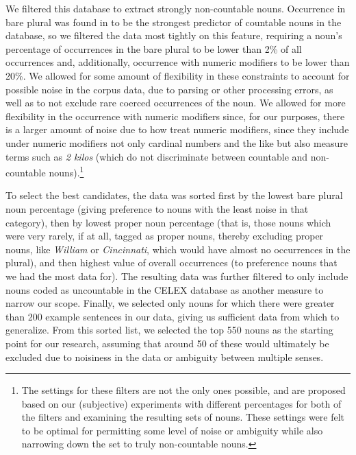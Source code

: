 \documentclass[output=paper]{langscibook}
\begin{document}
We filtered this database to extract strongly non-countable nouns. Occurrence in bare plural was found in \citet{GrimmWahlang2020} to be the strongest predictor of countable nouns in the database, so we filtered the data most tightly on this feature, requiring a noun's  percentage of occurrences in the bare plural  to be lower than 2\% of all occurrences and, additionally, occurrence with numeric modifiers to be lower  than 20\%. We allowed for some amount of flexibility in these constraints to account for possible noise in the corpus data, due to parsing or other processing errors, as well as to not exclude rare coerced occurrences of the noun.  We allowed for more flexibility in the occurrence with numeric modifiers  since, for our purposes, there is a larger amount of noise due to how  \citet{de-marneffe-etal2014} treat numeric modifiers, since they include under numeric modifiers not only cardinal numbers and the like but also measure terms such as \textit{2 kilos} (which do not discriminate between countable and non-countable nouns).\footnote{The settings for these filters are not the only ones possible, and are proposed based on our (subjective) experiments with different percentages for both of the filters and examining the resulting sets of nouns.  These settings were felt to be optimal for permitting some level of noise or ambiguity while also narrowing down the set to truly non-countable nouns.}





 

 To select the best candidates, the data was sorted first by the lowest bare plural noun percentage (giving preference to nouns with the least noise in that category), then by lowest proper noun percentage (that is, those nouns which were very rarely, if at all, tagged as proper nouns, thereby excluding proper nouns, like \textit{William} or \textit{Cincinnati}, which would have almost no occurrences in the plural), and then highest value of overall occurrences (to preference nouns that we had the most data for).  The resulting data was further filtered to only include nouns coded as uncountable in the CELEX database \citep{CELEX} as another measure to narrow our scope. Finally, we selected only nouns for which there were greater than 200 example sentences in our data, giving us sufficient data from which to generalize. From this sorted list, we selected the top 550 nouns as the starting point for our research,  assuming that around 50 of these would ultimately be excluded due to noisiness in the data or ambiguity between multiple senses.
\end{document}
